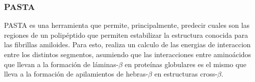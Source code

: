 % 



\subsubsection{PASTA}\label{pasta}


PASTA\cite{trovato2006insight} es una herramienta que permite, principalmente, predecir cuales son las regiones de un polipéptido que permiten estabilizar la estructura conocida para las fibrillas amiloides.
Para esto, realiza un calculo de las energias de interaccion entre los distintos segmentos, asumiendo que las interacciones entre aminoácidos que llevan a la formación 
de láminas-$\beta$ en proteínas globulares es el mismo que lleva a la formación de apilamientos de hebras-$\beta$ en estructuras cross-$\beta$.

